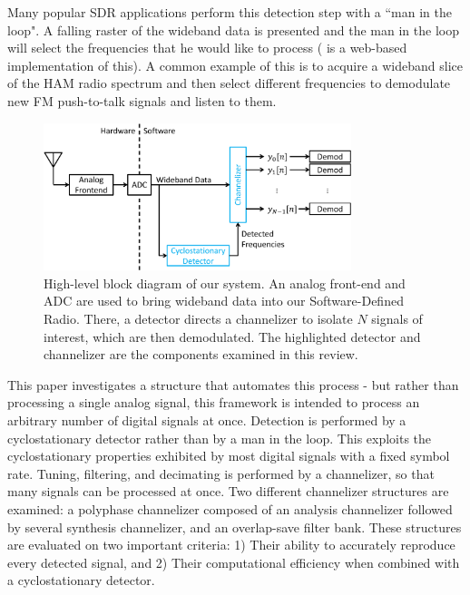 \documentclass[12pt]{report}
\begin{document}
Many popular SDR applications perform this detection step with a ``man in the
loop".  A falling raster of the wideband data is presented and the man in the
loop will select  the frequencies that he would like to process (\cite{WebSDR}
is a web-based implementation of this).  A common example of this is to acquire
a wideband slice of the HAM radio spectrum and then select different
frequencies to demodulate new FM push-to-talk signals and listen to them.

\begin{figure}[h!]
    \begin{center}
    \includegraphics[width=0.8\textwidth]{block_diagram}%
    \end{center}
    \caption{High-level block diagram of our system. An analog front-end and
        ADC are used to bring wideband data into our Software-Defined Radio.
        There, a detector directs a channelizer to isolate $N$ signals of interest,
        which are then demodulated. The highlighted detector and channelizer are the
        components examined in this review.}
    \label{fig:block_diagram}
\end{figure}

This paper investigates a structure that automates this process - but rather
than processing a single analog signal, this framework is intended to process
an arbitrary number of digital signals at once. Detection is performed by
a cyclostationary detector rather than by a man in the loop. This exploits the
cyclostationary properties exhibited by most digital signals with a fixed
symbol rate.  Tuning, filtering, and decimating is performed by a channelizer,
so that many signals can be processed at once.  Two different channelizer
structures are examined: a polyphase channelizer composed of an analysis
channelizer followed by several synthesis channelizer, and an overlap-save
filter bank. These structures are evaluated on two important criteria:
1) Their ability to accurately reproduce every detected signal, and 2) Their
computational efficiency when combined with a cyclostationary detector.
\end{document}
